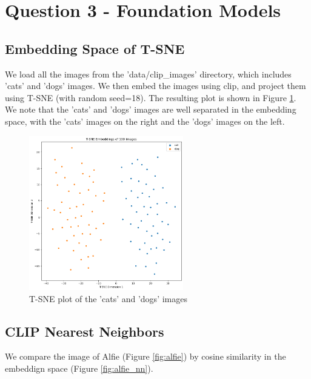 \documentclass{article}
\begin{document}
\newpage

\section{Question 3 - Foundation Models}

\subsection{Embedding Space of T-SNE}
We load all the images from the 'data/clip\_images' directory, which includes 'cats' and 'dogs' images. We then embed the images using clip, and project them using T-SNE (with random seed=18). The resulting plot is shown in Figure \ref{fig:tsne_plot}. We note that the 'cats' and 'dogs' images are well separated in the embedding space, with the 'cats' images on the right and the 'dogs' images on the left.
\begin{figure}[h!]
    \centering
    \includegraphics[width=0.6\textwidth]{figs/3.1_emb.png}
    \caption{T-SNE plot of the 'cats' and 'dogs' images}
    \label{fig:tsne_plot}
\end{figure}

\subsection{CLIP Nearest Neighbors}

We compare the image of Alfie (Figure \ref{fig:alfie}) by cosine similarity in the embeddign space (Figure \ref{fig:alfie_nn}). 
\end{document}
